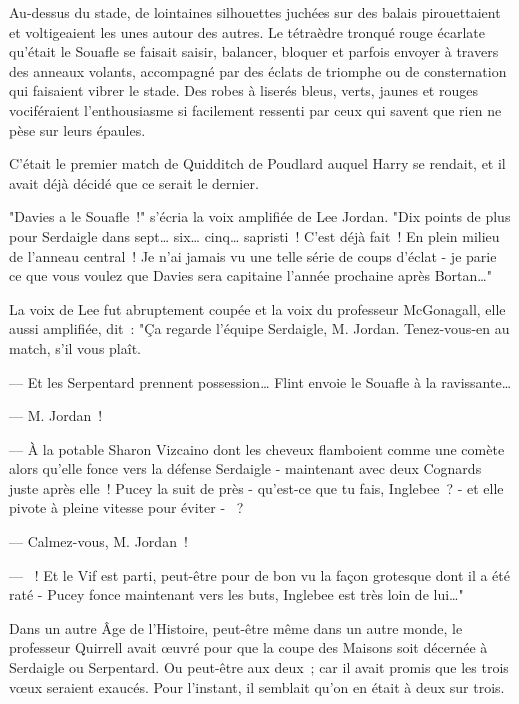 \later

Au-dessus du stade, de lointaines silhouettes juchées sur des balais pirouettaient et voltigeaient les unes autour des autres. Le tétraèdre tronqué rouge écarlate qu'était le Souafle se faisait saisir, balancer, bloquer et parfois envoyer à travers des anneaux volants, accompagné par des éclats de triomphe ou de consternation qui faisaient vibrer le stade. Des robes à liserés bleus, verts, jaunes et rouges vociféraient l'enthousiasme si facilement ressenti par ceux qui savent que rien ne pèse sur leurs épaules.

C'était le premier match de Quidditch de Poudlard auquel Harry se rendait, et il avait déjà décidé que ce serait le dernier.

"Davies a le Souafle~!" s'écria la voix amplifiée de Lee Jordan. "Dix points de plus pour Serdaigle dans sept… six… cinq… sapristi~! C'est déjà fait~! En plein milieu de l'anneau central~! Je n'ai jamais vu une telle série de coups d'éclat - je parie ce que vous voulez que Davies sera capitaine l'année prochaine après Bortan…"

La voix de Lee fut abruptement coupée et la voix du professeur McGonagall, elle aussi amplifiée, dit~: "Ça regarde l'équipe Serdaigle, M. Jordan. Tenez-vous-en au match, s'il vous plaît.

--- Et les Serpentard prennent possession… Flint envoie le Souafle à la ravissante…

--- M. Jordan~!

--- À la potable Sharon Vizcaino dont les cheveux flamboient comme une comète alors qu'elle fonce vers la défense Serdaigle - maintenant avec deux Cognards juste après elle~! Pucey la suit de près - qu'est-ce que tu fais, Inglebee~? - et elle pivote à pleine vitesse pour éviter - ~?

--- Calmez-vous, M. Jordan~!

--- ~! Et le Vif est parti, peut-être pour de bon vu la façon grotesque dont il a été raté - Pucey fonce maintenant vers les buts, Inglebee est très loin de lui…"

Dans un autre Âge de l'Histoire, peut-être même dans un autre monde, le professeur Quirrell avait œuvré pour que la coupe des Maisons soit décernée à Serdaigle ou Serpentard. Ou peut-être aux deux~; car il avait promis que les trois vœux seraient exaucés. Pour l'instant, il semblait qu'on en était à deux sur trois.

